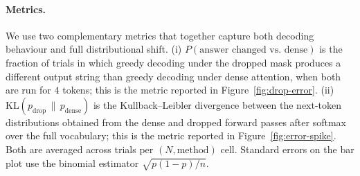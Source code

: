 \paragraph{Metrics.}
We use two complementary metrics that together capture both decoding behaviour
and full distributional shift. (i) $P(\text{answer changed vs.\ dense})$ is
the fraction of trials in which greedy decoding under the dropped mask
produces a different output string than greedy decoding under dense attention,
when both are run for $4$ tokens; this is the metric reported in
Figure~\ref{fig:drop-error}. (ii) $\mathrm{KL}(p_{\text{drop}}\,\|\,p_{\text{dense}})$
is the Kullback--Leibler divergence between the next-token distributions
obtained from the dense and dropped forward passes after softmax over the full
vocabulary; this is the metric reported in Figure~\ref{fig:error-spike}. Both
are averaged across trials per $(N, \text{method})$ cell. Standard errors on
the bar plot use the binomial estimator
$\sqrt{p(1-p)/n}$.

